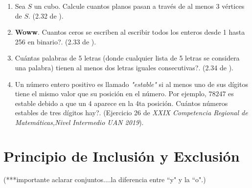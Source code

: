 \begin{enumerate}
	\item Sea $S$ un cubo. Calcule cuantos planos pasan a través de al menos 3 vértices de $S$. (2.32 de \cite{ICP_Aops}).
	
	\item \textbf{Woww}. Cuantos ceros se escriben al escribir todos los enteros desde 1 hasta 256 en binario?. (2.33 de \cite{ICP_Aops}).
	
	\item Cuántas palabras de 5 letras (donde cualquier lista de 5 letras se considera una palabra) tienen al menos dos letras iguales consecutivas?. (2.34 de \cite{ICP_Aops}).
	
	\item Un número entero positivo es llamado \textit{"estable"} si al menos uno de sus dígitos tiene el mismo valor que su posición en el número. Por ejemplo, $78247$ es estable debido a que un 4 aparece en la 4ta posición. Cuántos números estables de tres dígitos hay?. (Ejercicio 26 de \textit{XXIX Competencia Regional de Matemáticas,Nivel Intermedio UAN 2019}). 
\end{enumerate}
\newpage


\chapter{Principio de Inclusión y Exclusión}\label{Pinclusionyexclusion}
\vspace{3cm}

(***importante aclarar conjuntos....la diferencia entre ``y" y la ``o".)
\vspace{3cm}




